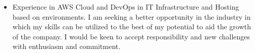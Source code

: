 \documentclass[10pt,a4paper,ragged2e,withhyper]{altacv}
\begin{document}
{\selectfont
\newenvironment{sloppypar*}{\sloppy\ignorespaces}{\par}


\makecvheader

\begin{itemize}

    \item \large{Experience in AWS Cloud and DevOps in IT Infrastructure and Hosting based on environments. I am seeking a better opportunity in the industry in which my skills can be utilized to the best of my potential to aid the growth of the company. I would be keen to accept responsibility and new challenges with enthusiasm and commitment.}
\end{itemize}

\begin{paracol}{2}


\end{paracol}}
\end{document}
